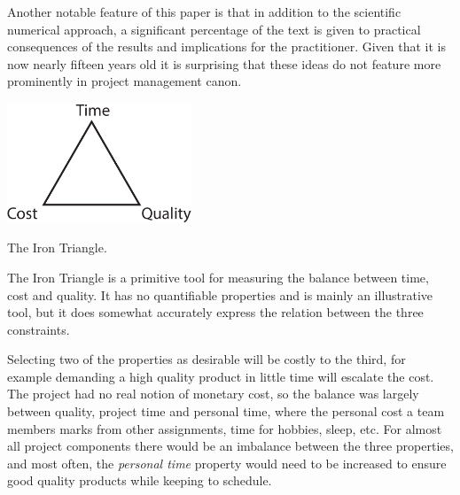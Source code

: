 Another notable feature of this paper is that in addition to the scientific numerical approach, a significant percentage of the text is given to practical consequences of the results and implications for the practitioner. Given that it is now nearly fifteen years old it is surprising that these ideas do not feature more prominently in project management canon.
%
%
%
\begin{marginfigure}
	\includegraphics[width=55mm]{res/pm/TCQ_triangle}
	\label{fig:TCQ_triangle}
	\caption[Iron Triangle]{The Iron Triangle.}
\end{marginfigure}

The Iron Triangle is a primitive tool for measuring the balance between time, cost and quality. It has no quantifiable properties and is mainly an illustrative tool, but it does somewhat accurately express the relation between the three constraints.

Selecting two of the properties as desirable will be costly to the third, for example demanding a high quality product in little time will escalate the cost. The project had no real notion of monetary cost, so the balance was largely between quality, project time and personal time, where the personal cost a team members marks from other assignments, time for hobbies, sleep, etc. For almost all project components there would be an imbalance between the three properties, and most often, the \emph{personal time} property would need to be increased to ensure good quality products while keeping to schedule.  


